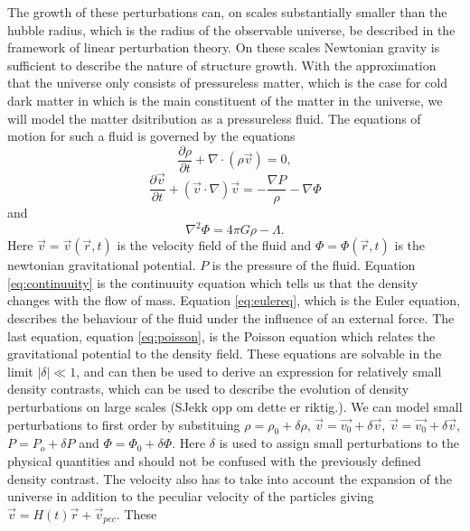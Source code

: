 The growth of these perturbations can, on scales substantially smaller than the
hubble radius, which is the radius of the observable universe, be described in
the framework of linear perturbation theory. On these scales Newtonian gravity
is sufficient to describe the nature of structure growth. With the approximation
that the universe only consists of pressureless matter, which is the case for
cold dark matter in which is the main constituent of the matter in the universe, we
will model the matter dsitribution as a pressureless fluid. The equations of
motion for such a fluid is governed by the equations
\begin{equation}\label{eq:continuuity}
    \frac{\partial \rho}{\partial t} + \nabla\cdot(\rho \vec{v})=0,
\end{equation}
\begin{equation}\label{eq:eulereq}
    \frac{\partial \vec{v}}{\partial t} + (\vec{v}\cdot\nabla)\vec{v}=-\frac{\nabla P}{\rho}-\nabla \Phi
\end{equation}
and
\begin{equation}\label{eq:poisson}
    \nabla ^2\Phi=4\pi G\rho -\Lambda.
\end{equation}
Here $\vec{v}=\vec{v}(\vec{r},t)$ is the velocity field of the fluid and $\Phi=\Phi(\vec{r},t)$
is the newtonian gravitational potential. $P$ is the pressure of the fluid. Equation \ref{eq:continuuity} is the
continuuity equation which tells us that the density changes with the flow of
mass. Equation \ref{eq:eulereq}, which is the Euler equation, describes the
behaviour of the fluid under the influence of an external force. The last
equation, equation \ref{eq:poisson}, is the Poisson equation which relates the
gravitational potential to the density field. These equations are solvable in
the limit $\vert\delta\vert \ll 1$, and can then be used to derive an expression
for relatively small density contrasts, which can be used to describe the
evolution of density perturbations on large scales (SJekk opp om dette er
riktig.). We can model small perturbations to first order by substituing $\rho =
\rho_0 + \delta \rho$, $\vec{v} =\vec{v_0} + \delta \vec{v}$, $\vec{v} =\vec{v_0}
+ \delta \vec{v}$, $P = P_o + \delta P$ and $\Phi = \Phi_0 +\delta\Phi$. Here
$\delta$ is used to assign small perturbations to the physical quantities and should not be
confused with the previously defined density contrast. The velocity also has to
take into account the expansion of the universe in addition to the peculiar
velocity of the particles giving $\vec{v} = H(t)\vec{r} + \vec{v}_{pec}$. These
